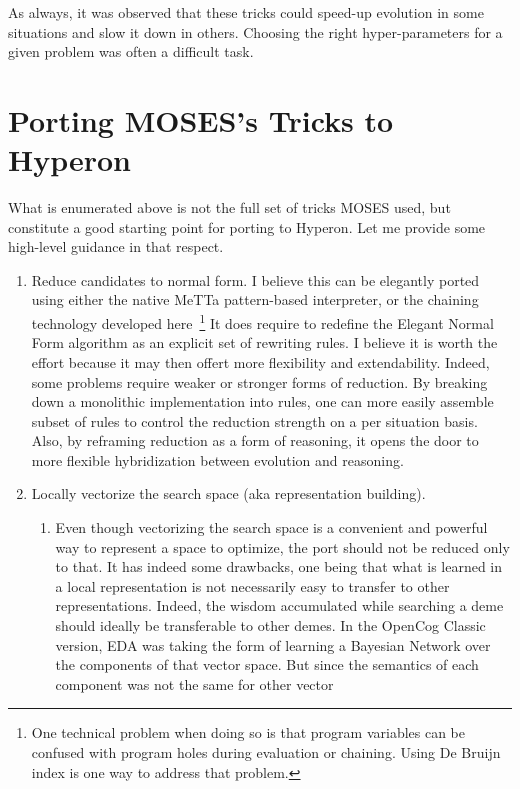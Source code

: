 \documentclass[]{report}
\begin{document}
As always, it was observed that these tricks could speed-up evolution
in some situations and slow it down in others.  Choosing the right
hyper-parameters for a given problem was often a difficult task.

\section{Porting MOSES's Tricks to Hyperon}

What is enumerated above is not the full set of tricks MOSES used, but
constitute a good starting point for porting to Hyperon.  Let me
provide some high-level guidance in that respect.

\begin{enumerate}
\item Reduce candidates to normal form.  I believe this can be elegantly
ported using either the native MeTTa pattern-based interpreter, or the
chaining technology developed here~\cite{Chaining}\footnote{One
technical problem when doing so is that program variables can be
confused with program holes during evaluation or chaining.  Using De
Bruijn index is one way to address that problem.}  It does require to
redefine the Elegant Normal Form algorithm as an explicit set of
rewriting rules.  I believe it is worth the effort because it may then
offert more flexibility and extendability.  Indeed, some problems
require weaker or stronger forms of reduction.  By breaking down a
monolithic implementation into rules, one can more easily assemble
subset of rules to control the reduction strength on a per situation
basis.  Also, by reframing reduction as a form of reasoning, it opens
the door to more flexible hybridization between evolution and
reasoning.
\item Locally vectorize the search space (aka representation building).
\begin{enumerate}
\item Even though vectorizing the search space is a convenient and powerful
way to represent a space to optimize, the port should not be reduced
only to that.  It has indeed some drawbacks, one being that what is
learned in a local representation is not necessarily easy to transfer
to other representations.  Indeed, the wisdom accumulated while
searching a deme should ideally be transferable to other demes.  In
the OpenCog Classic version, EDA was taking the form of learning a
Bayesian Network over the components of that vector space.  But since
the semantics of each component was not the same for other vector

\end{enumerate}
\end{enumerate}
\end{document}
